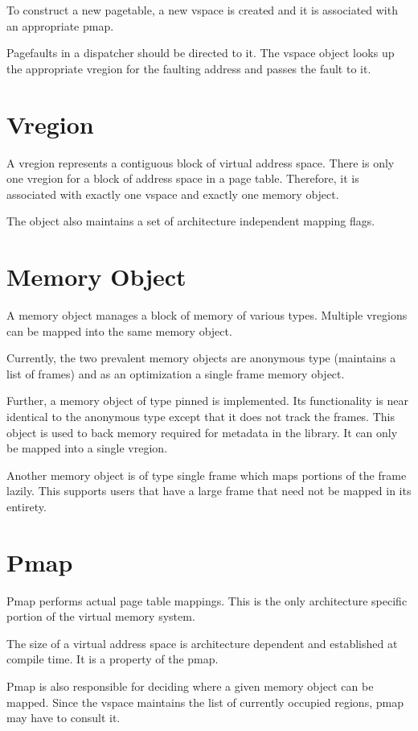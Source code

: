 \documentclass[a4paper,twoside]{report} %
\begin{document}
To construct a new pagetable,
a new vspace is created and it is associated with an appropriate pmap.

Pagefaults in a dispatcher should be directed to it.
The vspace object looks up the appropriate vregion for the faulting address and passes the fault to it.

\section{Vregion}
A vregion represents a contiguous block of virtual address space.
There is only one vregion for a block of address space in a page table.
Therefore, it is associated with exactly one vspace and exactly one memory object.

The object also maintains a set of architecture independent mapping flags.

\section{Memory Object}
A memory object manages a block of memory of various types.
Multiple vregions can be mapped into the same memory object.

Currently, the two prevalent memory objects are anonymous type (maintains a list of frames)
and as an optimization a single frame memory object.

Further, a memory object of type pinned is implemented.
Its functionality is near identical to the anonymous type
except that it does not track the frames.
This object is used to back memory required for metadata in the library.
It can only be mapped into a single vregion.

Another memory object is of type single frame which maps portions of the frame lazily.
This supports users that have a large frame that need not be mapped in its entirety.

\section{Pmap}
Pmap performs actual page table mappings.
This is the only architecture specific portion of the virtual memory system.

The size of a virtual address space is architecture dependent and established at compile time.
It is a property of the pmap.

Pmap is also responsible for deciding where a given memory object can be mapped.
Since the vspace maintains the list of currently occupied regions, pmap may have to consult it.
\end{document}
